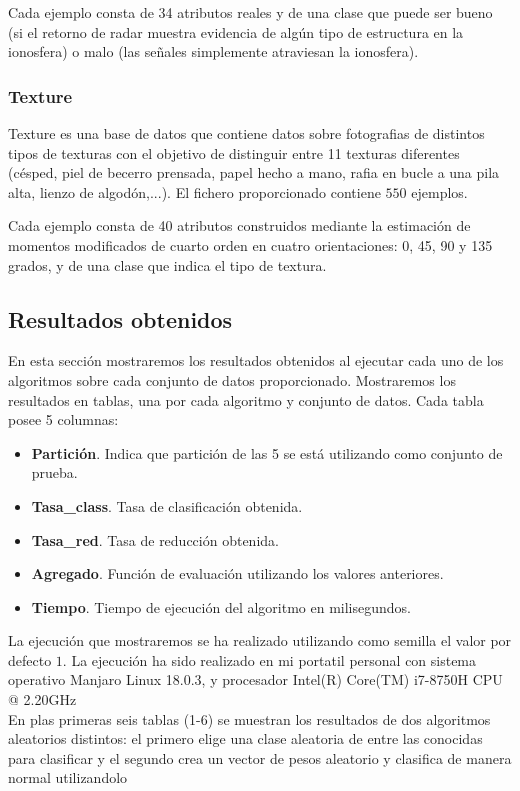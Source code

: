 \documentclass[size=a4, parskip=half, titlepage=false, toc=flat, toc=bib, 12pt]{scrartcl}
\begin{document}
Cada ejemplo consta de 34 atributos reales y de una clase que puede ser bueno (si el retorno de radar muestra evidencia de algún tipo de estructura en la ionosfera) o malo (las señales simplemente atraviesan la ionosfera).

\subsubsection{Texture}
Texture es una base de datos que contiene datos sobre fotografias de distintos tipos de texturas con el objetivo de distinguir entre 11 texturas diferentes (césped, piel de becerro prensada, papel hecho a
mano, rafia en bucle a una pila alta, lienzo de algodón,...). El fichero proporcionado contiene $550$ ejemplos.

Cada ejemplo consta de 40 atributos construidos mediante la estimación de momentos modificados de cuarto orden en cuatro orientaciones: 0, 45, 90 y 135 grados, y de una clase que indica el tipo de textura.

\subsection{Resultados obtenidos}
En esta sección mostraremos los resultados obtenidos al ejecutar cada uno de los algoritmos sobre cada conjunto de datos proporcionado. Mostraremos los resultados en tablas, una por cada algoritmo y conjunto de datos. Cada tabla posee 5 columnas:
\begin{itemize}
    \item \textbf{Partición}. Indica que partición de las 5 se está utilizando como conjunto de prueba.
    \item \textbf{Tasa\_class}. Tasa de clasificación obtenida.
    \item \textbf{Tasa\_red}. Tasa de reducción obtenida.
    \item \textbf{Agregado}. Función de evaluación utilizando los valores anteriores.
    \item \textbf{Tiempo}. Tiempo de ejecución del algoritmo en milisegundos.
\end{itemize}

La ejecución que mostraremos se ha realizado utilizando como semilla el valor por defecto $1$. La ejecución ha sido realizado en mi portatil personal con sistema operativo Manjaro Linux 18.0.3, y procesador Intel(R) Core(TM) i7-8750H CPU @ 2.20GHz\\

En plas primeras seis tablas (1-6) se muestran los resultados de dos algoritmos aleatorios distintos: el primero elige una clase aleatoria de entre las conocidas para clasificar y el segundo crea un vector de pesos aleatorio y clasifica de manera normal utilizandolo
\end{document}
